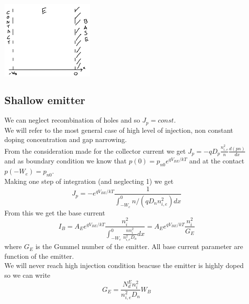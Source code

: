 \centering
\includegraphics[width=0.35\textwidth]{emi.png}\\
\raggedright

\subsection{Shallow emitter}
We can neglect recombination of holes and so $J_p=const$.\\
We will refer to the most general case of high level of injection, non constant doping concentration and gap narrowing.\\
From the consideration made for the collector current we get $J_p=-qD_p \frac{n_{i,e}^2}{n}\frac{d(pn)}{dx}$ and as boundary condition we know that $p(0)=p_{n0}e^{qV_{BE}/kT}$ and at the contact $p(-W_e)=p_{n0}$.\\
Making one step of integration (and neglecting 1) we get 
\begin{equation}
J_p=-e^{qV_{BE}/kT}\frac{1}{\int_{-W_e}^0 n/(qD_nn_{i,e}^2) dx}
\end{equation}
From this we get the base current
\begin{equation}
I_B= A_E e^{qV_{BE}/kT}\frac{n_i^2}{\int_{-W_e}^{0}\frac{n n_i^2}{n_{i,e}^2D_n} dx}=A_Ee^{qV_{BE}/kT}\frac{n_i^2}{G_E}
\end{equation}
where $G_E$ is the Gummel number of the emitter. All base current parameter are function of the emitter.\\
We will never reach high injection condition beacuse the emitter is highly doped so we can write
\begin{equation}
G_E= \frac{N_d^En_i^2}{n_{i,e}^2D_n}W_B 
\end{equation}

